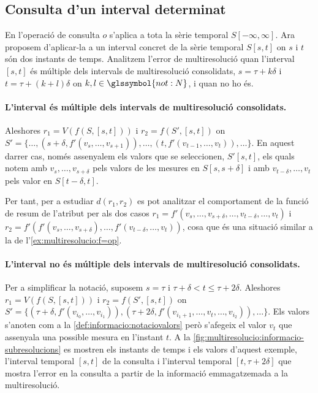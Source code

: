 \subsection{Consulta d'un interval determinat}
\label{ex:multireoslucio:informacio-subresolucions}

En  l'operació de consulta $o$
s'aplica a tota la sèrie temporal $S[-\infty,\infty]$. Ara proposem
d'aplicar-la a un interval concret de la sèrie temporal $S[s,t]$
on $s$ i $t$ són dos instants de temps.  Analitzem l'error de
multiresolució quan l'interval $[s,t]$ és múltiple dels intervals
de multiresolució consolidats, $s=\tau+k\delta$ i
$t=\tau+(k+l)\delta$ on $k,l\in\glssymbol{not:N}$, i quan no ho
és.


\paragraph{L'interval és múltiple dels intervals de multiresolució
  consolidats.} Aleshores $r_1=V(f(S,[s,t]))$ i
$r_2=f(S',[s,t])$ on $S'= \{ \dotsc, (s+\delta,
f'(v_{s},\dotsc,v_{s+1}) ), \dotsc, (t,
f'(v_{t-1},\dotsc,v_{t})), \dotsc \}$. En aquest darrer cas, només
assenyalem els valors que se seleccionen, $S'[s,t]$, els quals
notem amb $v_{s},\dotsc,v_{s+\delta}$ pels valors de les mesures en
$S[s,s+\delta]$ i amb $v_{t-\delta},\dotsc,v_{t}$ pels valor en
$S[t-\delta,t]$.

  Per tant, per a estudiar $d(r_1,r_2)$ es pot analitzar el
  comportament de la funció de resum de l'atribut per als dos casos
  $r_1=f'(v_{s},\dotsc,v_{s+\delta},\dotsc, v_{t-\delta},\dotsc,v_{t})$
  i $r_2=f'(f'(v_{s},\dotsc,v_{s+\delta}),\dotsc,
  f'(v_{t-\delta},\dotsc,v_{t}))$, cosa que és una situació similar a
  la de l'\autoref{ex:multiresolucio:f=op}.


  \paragraph{L'interval no és múltiple dels intervals de
    multiresolució consolidats.}  Per a simplificar la notació,
  suposem $s=\tau$ i $\tau+\delta < t \leq \tau+2\delta$.
  Aleshores $r_1=V(f(S,[s,t]))$ i $r_2=f(S',[s,t])$ on
  $S'= \{(\tau+\delta, f'(v_{i_0},\dotsc,v_{i_1}) ),(\tau+2\delta
  , f'(v_{i_1+1},\dotsc,v_{t} ,\dotsc,v_{i_2})), \dotsc \}$.  Els
  valors s'anoten com a la \autoref{def:informacio:notaciovalors} però
  s'afegeix el valor $v_t$ que assenyala una possible mesura en
  l'instant $t$.  A la
  \autoref{fig:multiresolucio:informacio-subresolucions} es mostren
  els instants de temps i els valors d'aquest exemple, l'interval
  temporal $[s,t]$ de la consulta i l'interval temporal
  $[t,\tau+2\delta]$ que mostra l'error en la consulta a partir
  de la informació emmagatzemada a la multiresolució.


